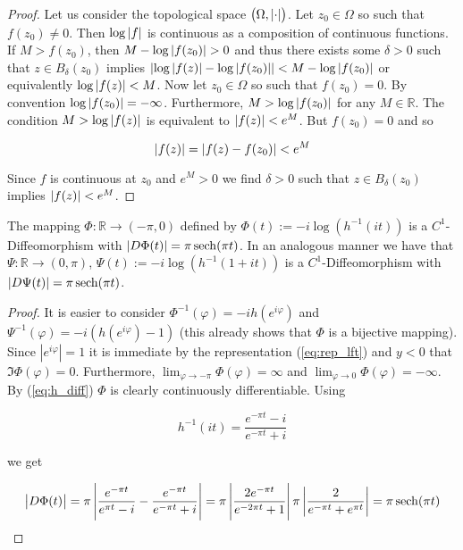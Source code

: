 \begin{proof}
	Let us consider the topological space $\del{ \Omega, \abs[0]{ \cdot}}$. Let $z_0 \in \Omega$ so such that $f(z_0) \neq 0$. Then $\log\abs[0]{ f}$ is continuous as a composition of continuous functions. If $M > f(z_0)$, then $M - \log\abs[0]{ f(z_0)} > 0$ and thus there exists some $\delta > 0$ such that $z \in B_\delta(z_0)$ implies $\abs[0]{ \log\abs[0]{ f(z)} - \log\abs[0]{ f(z_0)}} < M- \log\abs[0]{ f(z_0)}$ or equivalently $\log\abs[0]{ f(z)} < M$. Now let $z_0 \in \Omega$ so such that $f(z_0) = 0$. By convention $\log\abs[0]{ f(z_0)} = -\infty$. Furthermore, $M > \log\abs[0]{ f(z_0)}$ for any $M \in \mathbb{R}$. The condition $M > \log\abs[0]{ f(z)}$ is equivalent to $\abs[0]{ f(z)} < e^M$. But $f(z_0) = 0$ and so

	\begin{equation*}
		\abs[0]{ f(z)} = \abs[0]{ f(z) - f(z_0)}< e^M
	\end{equation*}

	Since $f$ is continuous at $z_0$ and $e^M > 0$ we find $\delta > 0$ such that $z \in B_\delta(z_0)$ implies $\abs[0]{ f(z)} < e^M$.
\end{proof}

\begin{lemma}
	The mapping $\Phi: \mathbb{R} \rightarrow (-\pi,0)$ defined by $\Phi(t) := -i\log\left( h^{-1}(it) \right)$ is a $C^1$-Diffeomorphism with $\vert D\Phi(t)\vert = \pi \operatorname{sech}(\pi t)$. In an analogous manner we have that $\Psi: \mathbb{R} \rightarrow (0,\pi)$, $\Psi(t) := -i\log\left( h^{-1}(1 + it) \right)$ is a $C^1$-Diffeomorphism with $\vert D\Psi(t)\vert = \pi \operatorname{sech}(\pi t)$.
	\label{lem:change_of_variables}
\end{lemma}

\begin{proof}
	It is easier to consider $\Phi^{-1}(\varphi) = -i h(e^{i\varphi})$ and $\Psi^{-1}(\varphi) = -i\left( h(e^{i\varphi}) - 1 \right)$ (this already shows that $\Phi$ is a bijective mapping). Since $\left| e^{i\varphi}\right| = 1$ it is immediate by the representation (\ref{eq:rep_lft}) and $y < 0$ that $\Im \Phi(\varphi) = 0$. Furthermore, $\lim_{\varphi \rightarrow -\pi} \Phi(\varphi) = \infty$ and $\lim_{\varphi \rightarrow 0} \Phi(\varphi) = -\infty$. By (\ref{eq:h_diff}) $\Phi$ is clearly continuously differentiable. Using
	
	\begin{equation*}
		h^{-1}(it) = \frac{e^{-\pi t} - i}{e^{-\pi t} + i}
	\end{equation*}
	
	we get

	\begin{gather*}
		\left| D\Phi(t)\right| = \pi\left| \frac{e^{-\pi t}}{e^{\pi t} - i} - \frac{e^{-\pi t}}{e^{-\pi t} + i}\right| = \pi\left| \frac{2e^{-\pi t}}{e^{-2\pi t} + 1}\right| \pi \left| \frac{2}{e^{-\pi t} + e^{\pi t}}\right|= \pi \operatorname{sech}(\pi t)
	\end{gather*}
\end{proof}

